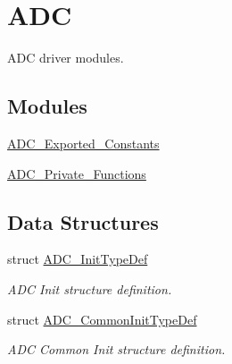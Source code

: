 \hypertarget{group___a_d_c}{\section{A\-D\-C}
\label{group___a_d_c}
}


A\-D\-C driver modules.  


\subsection*{Modules}
\begin{DoxyCompactItemize}
\item 
\hyperlink{group___a_d_c___exported___constants}{A\-D\-C\-\_\-\-Exported\-\_\-\-Constants}
\item 
\hyperlink{group___a_d_c___private___functions}{A\-D\-C\-\_\-\-Private\-\_\-\-Functions}
\end{DoxyCompactItemize}
\subsection*{Data Structures}
\begin{DoxyCompactItemize}
\item 
struct \hyperlink{struct_a_d_c___init_type_def}{A\-D\-C\-\_\-\-Init\-Type\-Def}
\begin{DoxyCompactList}\small\item\em A\-D\-C Init structure definition. \end{DoxyCompactList}\item 
struct \hyperlink{struct_a_d_c___common_init_type_def}{A\-D\-C\-\_\-\-Common\-Init\-Type\-Def}
\begin{DoxyCompactList}\small\item\em A\-D\-C Common Init structure definition. \end{DoxyCompactList}\end{DoxyCompactItemize}
